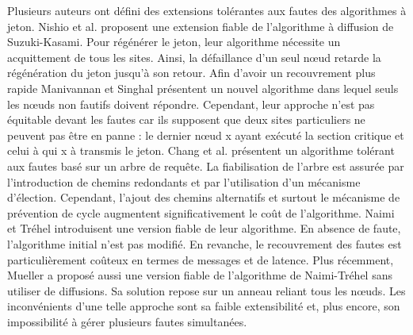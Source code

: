 

Plusieurs auteurs ont défini des extensions tolérantes aux fautes des algorithmes à jeton. Nishio et al. proposent une extension fiable de l'algorithme à diffusion de Suzuki-Kasami.
Pour régénérer le jeton, leur algorithme nécessite un acquittement de tous les sites. Ainsi, la défaillance d'un seul nœud retarde la régénération du jeton jusqu'à son retour. Afin d'avoir un recouvrement plus rapide Manivannan et Singhal présentent un nouvel algorithme dans lequel seuls les nœuds non fautifs doivent répondre. Cependant, leur approche n'est pas équitable devant les fautes car ils supposent que deux sites particuliers ne peuvent pas être en panne : le dernier nœud x ayant exécuté la section critique et celui à qui x à transmis le jeton.
Chang et al. présentent un algorithme tolérant aux fautes basé sur un arbre de requête.
La fiabilisation de l'arbre est assurée par l'introduction de chemins redondants et par l'utilisation d'un mécanisme d'élection. Cependant, l'ajout des chemins alternatifs et surtout le mécanisme de prévention de cycle augmentent significativement le coût de l'algorithme.
Naimi et Tréhel introduisent une version fiable de leur algorithme. En absence de faute, l'algorithme initial n'est pas modifié. En revanche, le recouvrement des fautes est particulièrement coûteux en termes de messages et de latence.
Plus récemment, Mueller a proposé aussi une version fiable de l'algorithme de Naimi-Tréhel sans utiliser de diffusions. Sa solution repose sur un anneau reliant tous les nœuds.
Les inconvénients d'une telle approche sont sa faible extensibilité et, plus encore, son impossibilité à gérer plusieurs fautes simultanées.
